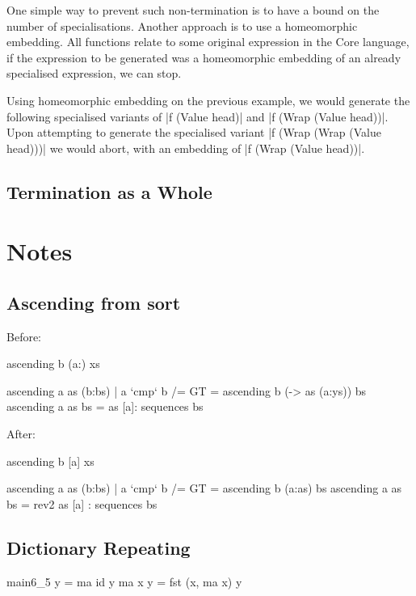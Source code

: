 \documentclass[preprint]{sigplanconf}
\begin{document}
One simple way to prevent such non-termination is to have a bound on the number of specialisations. Another approach is to use a homeomorphic embedding. All functions relate to some original expression in the Core language, if the expression to be generated was a homeomorphic embedding of an already specialised expression, we can stop.

Using homeomorphic embedding on the previous example, we would generate the following specialised variants of |f (Value head)| and |f (Wrap (Value head))|. Upon attempting to generate the specialised variant |f (Wrap (Wrap (Value head)))| we would abort, with an embedding of |f (Wrap (Value head))|.

\subsection{Termination as a Whole}




\section{Notes}

\subsection{Ascending from sort}

Before:

\begin{code}
ascending  b (a:) xs

ascending a as (b:bs)
  | a `cmp` b /= GT = ascending b (\ys -> as (a:ys)) bs
ascending a as bs   = as [a]: sequences bs
\end{code}

After:

\begin{code}
ascending  b [a] xs

ascending a as (b:bs)
  | a `cmp` b /= GT = ascending b (a:as) bs
ascending a as bs   = rev2 as [a] : sequences bs
\end{code}

\subsection{Dictionary Repeating}

\begin{code}
main6_5 y = ma id y
ma x y = fst (x, ma x) y
\end{code}
\end{document}
